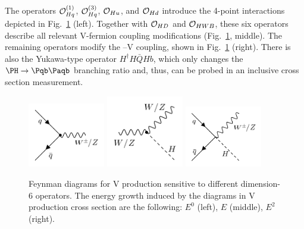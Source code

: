 \documentclass[a4paper,11pt]{article}
\newcommand{\Pb}{{{\Pqb}}\xspace}
\newcommand{\PAb}{{{{\Paqb}}}\xspace}
\renewcommand{\PV}{{{{V}}}\xspace}
\newcommand{\VH}{{{\PV}{\PH}}\xspace}
\begin{document}
The operators ${\cal O}^{(1)}_{Hq}$, ${\cal O}^{(3)}_{Hq}$, ${\cal O}_{Hu}$, and ${\cal O}_{Hd}$ introduce the 4-point interactions depicted in Fig.~\ref{fig:Feynman_digarams} (left). 
Together with ${\cal O}_{HD}$ and ${\cal O}_{HWB}$, these six operators describe all relevant \PV-fermion coupling modifications (Fig.~\ref{fig:Feynman_digarams}, middle). 
The remaining operators modify the \PH--\PV coupling, shown in Fig.~\ref{fig:Feynman_digarams} (right). 
There is also the Yukawa-type operator $H^\dagger H \bar{Q}H b$, which only changes the $\PH \to \Pb \PAb$ branching ratio and, thus, can be probed in an inclusive cross section measurement. 
\begin{figure}[hbtp]
\begin{center}
\includegraphics[width=0.3\textwidth]{Figures/Feynman_diagrams/Vff.png}
\includegraphics[width=0.3\textwidth]{Figures/Feynman_diagrams/hVV.png}
\includegraphics[width=0.3\textwidth]{Figures/Feynman_diagrams/ffVh.png}
\end{center}
\caption{
Feynman diagrams for \VH production sensitive to different dimension-6 operators.
The energy growth induced by the diagrams in \VH production cross section are the following: $E^0$ (left), $E$ (middle), $E^2$ (right). 
}
\label{fig:Feynman_digarams}
\end{figure}

\end{document}
